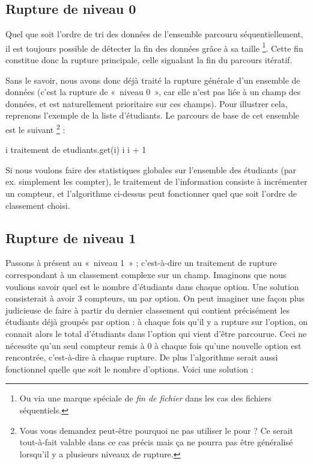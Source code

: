 \subsection*{Rupture de niveau 0}

	Quel que soit l’ordre de tri des données de l'ensemble parcouru séquentiellement, 
	il est toujours possible de détecter la fin des données grâce à sa taille%
	\footnote{%
		Ou via une marque spéciale de \emph{fin de fichier}
		dans les cas des fichiers séquentiels.
	}.
	Cette \og{}fin\fg{} constitue donc la rupture principale, 
	celle signalant la fin du parcours itératif.
	
	Sans le savoir, nous avons donc déjà traité la rupture générale d’un
	ensemble de données (c’est la rupture de «~niveau 0~»,
	car elle n’est pas liée à un champ des données, 
	et est naturellement prioritaire sur ces champs). 
	Pour illustrer cela, reprenons l’exemple de la liste d’étudiants. 
	Le parcours de base de cet ensemble est le suivant%
	\footnote{%
		Vous vous demandez peut-être pourquoi ne pas utiliser le \og{}pour\fg{} ?
		Ce serait tout-à-fait valable dans ce cas précis mais ça ne pourra pas
		être généralisé lorsqu'il y a plusieurs niveaux de rupture.
	} :

	\begin{LDA}
			\Let i 
				\LComment traitement de etudiants.get(i)
				\Let i \Gets i + 1
			\EndWhile
		\EndAlgo
	\end{LDA}

	Si nous voulons faire des statistiques globales sur l’ensemble des
	étudiants (par ex. simplement les compter), le traitement de
	l’information consiste à incrémenter un compteur, et l’algorithme
	ci-dessus peut fonctionner quel que soit l’ordre de classement choisi.

\subsection*{Rupture de niveau 1}

	Passons à présent au «~niveau 1~» ; c’est-à-dire un traitement de
	rupture correspondant à un classement complexe sur un champ. 
	Imaginons que nous voulions savoir quel est le nombre d’étudiants dans chaque option. 
	Une solution consisterait à avoir 3 compteurs, un par option.
	On peut imaginer une façon plus judicieuse de faire à partir du dernier classement
	qui contient précisément les étudiants déjà groupés par option : 
	à chaque fois qu’il y a rupture sur l’option, 
	on connait alors le total d’étudiants dans l’option qui vient d’être parcourue. 
	Ceci ne nécessite qu’un seul compteur remis à 0 à chaque fois qu’une nouvelle
	option est rencontrée, c’est-à-dire à chaque rupture. 
	De plus l’algorithme serait aussi fonctionnel quelle que soit le nombre d’options. 
	Voici une solution : 


